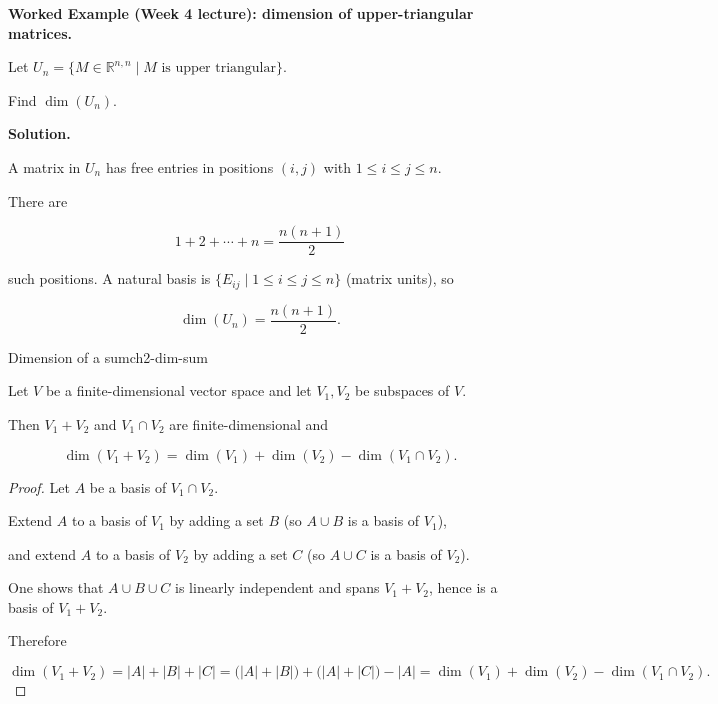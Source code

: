 \begin{examplebox}

\textbf{Worked Example (Week 4 lecture): dimension of upper-triangular matrices.}

Let $U_n=\{M\in\mathbb{R}^{n,n}\mid M \text{ is upper triangular}\}$.

Find $\dim(U_n)$.

\medskip

\textbf{Solution.}

A matrix in $U_n$ has free entries in positions $(i,j)$ with $1\le i\le j\le n$.

There are

\[
1+2+\cdots+n=\frac{n(n+1)}{2}
\]

such positions. A natural basis is $\{E_{ij}\mid 1\le i\le j\le n\}$ (matrix units), so

\[
\dim(U_n)=\frac{n(n+1)}{2}.
\]

\end{examplebox}

\begin{theorem}{Dimension of a sum}{ch2-dim-sum}

Let $V$ be a finite-dimensional vector space and let $V_1,V_2$ be subspaces of $V$.

Then $V_1+V_2$ and $V_1\cap V_2$ are finite-dimensional and

\[
\dim(V_1+V_2)=\dim(V_1)+\dim(V_2)-\dim(V_1\cap V_2).
\]

\begin{proof}

Let $A$ be a basis of $V_1\cap V_2$.

Extend $A$ to a basis of $V_1$ by adding a set $B$ (so $A\cup B$ is a basis of $V_1$),

and extend $A$ to a basis of $V_2$ by adding a set $C$ (so $A\cup C$ is a basis of $V_2$).

One shows that $A\cup B\cup C$ is linearly independent and spans $V_1+V_2$, hence is a basis of $V_1+V_2$.

Therefore

\[
\dim(V_1+V_2)=|A|+|B|+|C|
=\bigl(|A|+|B|\bigr)+\bigl(|A|+|C|\bigr)-|A|
=\dim(V_1)+\dim(V_2)-\dim(V_1\cap V_2).
\]

\end{proof}

\end{theorem}

